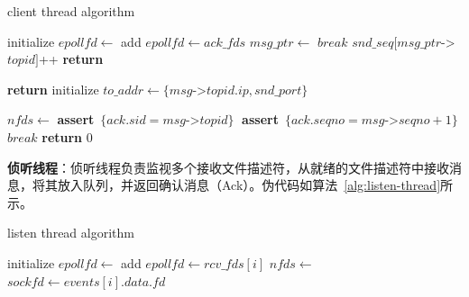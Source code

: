 {\begin{enumerate}[label=\arabic*.]
    \begin{algorithm}[H]
        \caption{client thread algorithm}\label{alg:client-thread}
        \begin{algorithmic}[1] %
                \State initialize $epollfd \gets$ 
                \State add $epollfd \gets ack\_fds$
                    \State {}
                    \State $msg\_ptr \gets$ 
                            \State $break$
                        \EndIf
                    \EndFor
                    \State $snd\_seq[msg\_ptr$->$topid]$++
                    \State {}
                \EndWhile
                \State \textbf{return}
             \EndProcedure
    
                    \State \textbf{return}  
                \Else
                    \State initialize $to\_addr \gets \{msg$->$topid.ip,snd\_port \}$
                    \State {}
                \EndIf
    
                    \State $nfds \gets$  
                    \State {}
                    \State \textbf{assert}~$\{ack.sid = msg$->$topid\}\;$
                    \State \textbf{assert}~$\{ack.seqno = msg$->$seqno+1\}\;$
                    \State $break$
                \EndWhile
                \State \textbf{return} $0$
            \EndFunction
        \end{algorithmic}
    \end{algorithm}

    \textbf{侦听线程}：侦听线程负责监视多个接收文件描述符，从就绪的文件描述符中接收消息，将其放入队列，并返回确认消息（Ack）。伪代码如算法~\ref{alg:listen-thread}所示。
    \begin{algorithm}[H]
        \caption{listen thread algorithm}\label{alg:listen-thread}
        \begin{algorithmic}[1] %
                \State initialize $epollfd \gets$ 
                    \State add $epollfd \gets rcv\_fds[i]$
                \EndFor
                    \State $nfds \gets$  
                        \State $sockfd \gets events[i].data.fd$
                        \State {} 
                        

\end{algorithmic}
\end{algorithm}
\end{enumerate}}
